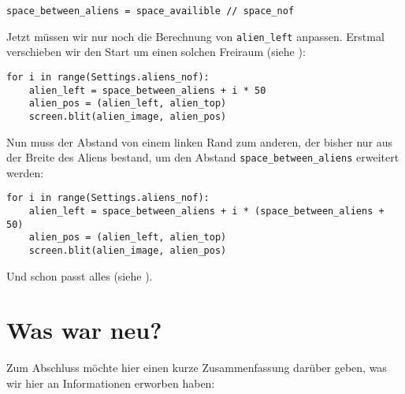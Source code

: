 \lstset{firstnumber=32}
\begin{lstlisting}
space_between_aliens = space_availible // space_nof
\end{lstlisting}

Jetzt müssen wir nur noch die Berechnung von \texttt{alien\_left} anpassen. Erstmal verschieben wir den Start um einen solchen Freiraum (siehe ):

\lstset{firstnumber=45}
\begin{lstlisting}
for i in range(Settings.aliens_nof):
    alien_left = space_between_aliens + i * 50
    alien_pos = (alien_left, alien_top)
    screen.blit(alien_image, alien_pos)
\end{lstlisting}


Nun muss der Abstand von einem linken Rand zum anderen, der bisher nur aus der Breite des Aliens bestand, um den Abstand \texttt{space\_between\_aliens} erweitert werden:

\lstset{firstnumber=45}
\begin{lstlisting}
for i in range(Settings.aliens_nof):
    alien_left = space_between_aliens + i * (space_between_aliens + 50)
    alien_pos = (alien_left, alien_top)
    screen.blit(alien_image, alien_pos)
\end{lstlisting} 

Und schon passt alles (siehe ).


\section{Was war neu?}

Zum Abschluss möchte hier einen kurze Zusammenfassung darüber geben, was wir hier an Informationen erworben haben:

